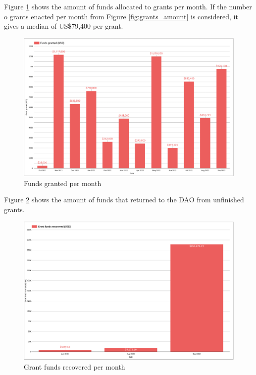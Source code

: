 \documentclass[MSE,Master,english]{twbook}%
\begin{document}
Figure \ref{fig:funds_granted} shows the amount of funds allocated to grants per month. If the number o grants enacted per month from Figure \ref{fig:grants_amount} is considered, it gives a median of US\$79,400 per grant.
\begin{figure}[H]
  \centering
  \includegraphics[width=\textwidth]{metrics/funds_granted.png}
  \caption{Funds granted per month}
  \label{fig:funds_granted}
\end{figure}

Figure \ref{fig:funds_recovered} shows the amount of funds that returned to the DAO from unfinished grants.
\begin{figure}[H]
  \centering
  \includegraphics[width=\textwidth]{metrics/funds_recovered.png}
  \caption{Grant funds recovered per month}
  \label{fig:funds_recovered}
\end{figure}
\end{document}
